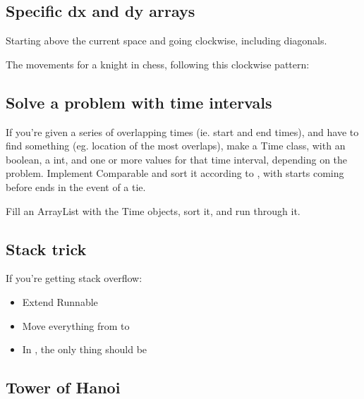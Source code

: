 

\subsection*{Specific dx and dy arrays}

Starting above the current space and going clockwise, including diagonals.



The movements for a knight in chess, following this clockwise pattern:



\subsection*{Solve a problem with time intervals}

If you’re given a series of overlapping times (ie. start and end times), and have to find something (eg. location of the most overlaps), make a Time class, with an  boolean, a  int, and one or more values for that time interval, depending on the problem. Implement Comparable and sort it according to , with starts coming before ends in the event of a tie.

Fill an ArrayList with the Time objects, sort it, and run through it.

\subsection*{Stack trick}

If you're getting stack overflow:

\begin{itemize}
    \item Extend Runnable
    \item Move everything from  to 
    \item In , the only thing should be 
\end{itemize}

\subsection*{Tower of Hanoi}

